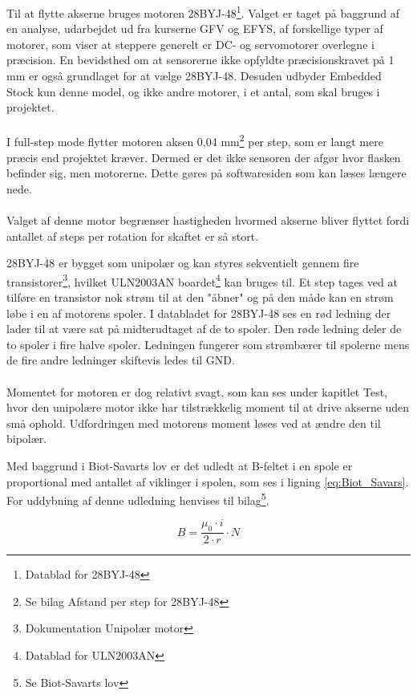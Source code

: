 Til at flytte akserne bruges motoren 28BYJ-48\footnote{Datablad for 28BYJ-48}. Valget er taget på baggrund af en analyse, udarbejdet ud fra kurserne GFV og EFYS, af forskellige typer af motorer, som viser at steppere generelt er DC- og servomotorer overlegne i præcision. En bevidsthed om at sensorerne ikke opfyldte præcisionskravet på 1 mm er også grundlaget for at vælge 28BYJ-48. Desuden udbyder Embedded Stock kun denne model, og ikke andre motorer, i et antal, som skal bruges i projektet.
\\
\\
I full-step mode flytter motoren aksen 0,04 mm\footnote{Se bilag Afstand per step for 28BYJ-48} per step, som er langt mere præcis end projektet kræver. Dermed er det ikke sensoren der afgør hvor flasken befinder sig, men motorerne. Dette gøres på softwaresiden som kan læses længere nede.
\\
\\
Valget af denne motor begrænser hastigheden hvormed akserne bliver flyttet fordi antallet af steps per rotation for skaftet er så stort.

28BYJ-48 er bygget som unipolær og kan styres sekventielt gennem fire transistorer\footnote{Dokumentation Unipolær motor}, hvilket ULN2003AN boardet\footnote{Datablad for ULN2003AN} kan bruges til. Et step tages ved at tilføre en transistor nok strøm til at den "åbner" og på den måde kan en strøm løbe i en af motorens spoler. I databladet for 28BYJ-48 ses en rød ledning der lader til at være sat på midterudtaget af de to spoler. Den røde ledning deler de to spoler i fire halve spoler. Ledningen fungerer som strømbærer til spolerne mens de fire andre ledninger skiftevis ledes til GND.
\\
\\
Momentet for motoren er dog relativt svagt, som kan ses under kapitlet Test, hvor den unipolære motor ikke har tilstrækkelig moment til at drive akserne uden små ophold. Udfordringen med motorens moment løses ved at ændre den til bipolær.

Med baggrund i Biot-Savarts lov er det udledt at B-feltet i en spole er proportional med antallet af viklinger i spolen, som ses i ligning \ref{eq:Biot_Savars}. For uddybning af denne udledning henvises til bilag\footnote{Se Biot-Savarts lov}.

\begin{equation} \label{eq:Biot_Savars}
	B = \frac{\mu_0 \cdot i}{2 \cdot r} \cdot N
\end{equation}

